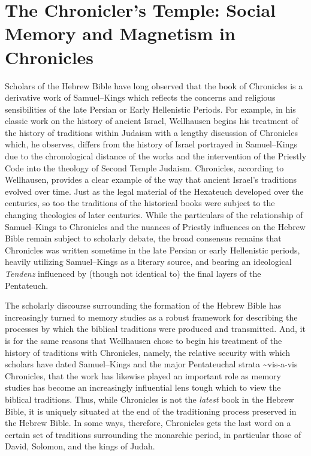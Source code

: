 \chapter{The Chronicler's Temple: Social Memory and Magnetism in
Chronicles}\label{the-chroniclers-temple-social-memory-and-magnetism-in-chronicles}

Scholars of the Hebrew Bible have long observed that the book of
Chronicles is a derivative work of Samuel--Kings which reflects the
concerns and religious sensibilities of the late Persian or Early
Hellenistic Periods. For example, in his classic work on the history of
ancient Israel, Wellhausen begins his treatment of the history of
traditions within Judaism with a lengthy discussion of Chronicles which,
he observes, differs from the history of Israel portrayed in
Samuel--Kings due to the chronological distance of the works and the
intervention of the Priestly Code into the theology of Second Temple
Judaism.\autocites[171--172]{wellhausen1957}[See
also][]{wright_ulrich-wright1992} Chronicles, according to Wellhausen,
provides a clear example of the way that ancient Israel's traditions
evolved over time. Just as the legal material of the Hexateuch developed
over the centuries, so too the traditions of the historical books were
subject to the changing theologies of later centuries. While the
particulars of the relationship of Samuel--Kings to Chronicles and the
nuances of Priestly influences on the Hebrew Bible remain subject to
scholarly debate, the broad consensus remains that Chronicles was
written sometime in the late Persian or early Hellenistic periods,
heavily utilizing Samuel--Kings as a literary source, and bearing an
ideological \emph{Tendenz} influenced by (though not identical to) the
final layers of the Pentateuch.\autocites[For a thorough and reasonably
recent summary of the \emph{status questionis},
see][72--89]{knoppers2003}[See
also][]{japhet1993}{japhet2009}{braun1986}[and][]{coggins1976}

The scholarly discourse surrounding the formation of the Hebrew Bible
has increasingly turned to memory studies as a robust framework for
describing the processes by which the biblical traditions were produced
and
transmitted.\autocites{wright2014}{blenkinsopp2013}{rogerson2010}{davies2008}{hendel2005}{smith_cbq2002}
And, it is for the same reasons that Wellhausen chose to begin his
treatment of the history of traditions with Chronicles, namely, the
relative security with which scholars have dated Samuel--Kings and the
major Pentateuchal strata \textasciitilde{}vis-a-vis Chronicles, that
the work has likewise played an important role as memory studies has
become an increasingly influential lens tough which to view the biblical
traditions.\autocites{benzvi_st2017}{benzvi-a_evans-williams2013}{benzvi-b_evans-williams2013}
Thus, while Chronicles is not the \emph{latest} book in the Hebrew
Bible, it is uniquely situated at the end of the traditioning process
preserved in the Hebrew Bible. In some ways, therefore, Chronicles gets
the last word on a certain set of traditions surrounding the monarchic
period, in particular those of David, Solomon, and the kings of Judah.

